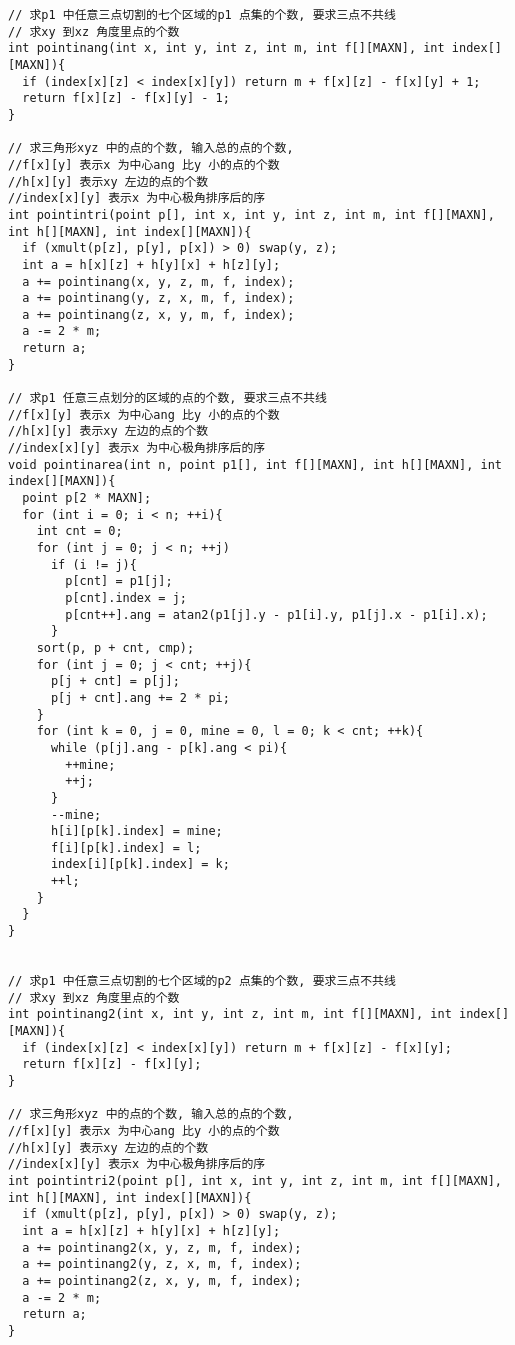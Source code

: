\begin{lstlisting}[language={}]
// 求p1 中任意三点切割的七个区域的p1 点集的个数, 要求三点不共线 
// 求xy 到xz 角度里点的个数 
int pointinang(int x, int y, int z, int m, int f[][MAXN], int index[][MAXN]){
  if (index[x][z] < index[x][y]) return m + f[x][z] - f[x][y] + 1;
  return f[x][z] - f[x][y] - 1;
}

// 求三角形xyz 中的点的个数, 输入总的点的个数,  
//f[x][y] 表示x 为中心ang 比y 小的点的个数
//h[x][y] 表示xy 左边的点的个数
//index[x][y] 表示x 为中心极角排序后的序 
int pointintri(point p[], int x, int y, int z, int m, int f[][MAXN], int h[][MAXN], int index[][MAXN]){
  if (xmult(p[z], p[y], p[x]) > 0) swap(y, z);
  int a = h[x][z] + h[y][x] + h[z][y];
  a += pointinang(x, y, z, m, f, index);
  a += pointinang(y, z, x, m, f, index);
  a += pointinang(z, x, y, m, f, index);
  a -= 2 * m;
  return a;
}

// 求p1 任意三点划分的区域的点的个数, 要求三点不共线  
//f[x][y] 表示x 为中心ang 比y 小的点的个数
//h[x][y] 表示xy 左边的点的个数
//index[x][y] 表示x 为中心极角排序后的序 
void pointinarea(int n, point p1[], int f[][MAXN], int h[][MAXN], int index[][MAXN]){
  point p[2 * MAXN];
  for (int i = 0; i < n; ++i){
    int cnt = 0;
    for (int j = 0; j < n; ++j)
      if (i != j){
        p[cnt] = p1[j];
        p[cnt].index = j;
        p[cnt++].ang = atan2(p1[j].y - p1[i].y, p1[j].x - p1[i].x);
      }
    sort(p, p + cnt, cmp);
    for (int j = 0; j < cnt; ++j){
      p[j + cnt] = p[j];
      p[j + cnt].ang += 2 * pi;
    }
    for (int k = 0, j = 0, mine = 0, l = 0; k < cnt; ++k){
      while (p[j].ang - p[k].ang < pi){
        ++mine;
        ++j;
      }
      --mine;
      h[i][p[k].index] = mine;
      f[i][p[k].index] = l;
      index[i][p[k].index] = k;
      ++l;
    }
  }
}


// 求p1 中任意三点切割的七个区域的p2 点集的个数, 要求三点不共线 
// 求xy 到xz 角度里点的个数 
int pointinang2(int x, int y, int z, int m, int f[][MAXN], int index[][MAXN]){
  if (index[x][z] < index[x][y]) return m + f[x][z] - f[x][y];
  return f[x][z] - f[x][y];
}

// 求三角形xyz 中的点的个数, 输入总的点的个数,  
//f[x][y] 表示x 为中心ang 比y 小的点的个数
//h[x][y] 表示xy 左边的点的个数
//index[x][y] 表示x 为中心极角排序后的序 
int pointintri2(point p[], int x, int y, int z, int m, int f[][MAXN], int h[][MAXN], int index[][MAXN]){
  if (xmult(p[z], p[y], p[x]) > 0) swap(y, z);
  int a = h[x][z] + h[y][x] + h[z][y];
  a += pointinang2(x, y, z, m, f, index);
  a += pointinang2(y, z, x, m, f, index);
  a += pointinang2(z, x, y, m, f, index);
  a -= 2 * m;
  return a;
}


\end{lstlisting}
